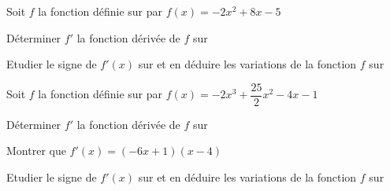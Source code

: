 \documentclass[12pt,a4paper]{book}
\begin{document}
Soit $f$ la fonction définie sur \R par $f(x)=-2x^2+8x-5$
\begin{enumMet}
	\item Déterminer $f'$ la fonction dérivée de $f$ sur \R
	\item Etudier le signe de $f'(x)$ sur \R et en déduire les variations de la fonction $f$ sur \R
\end{enumMet}

\exerciceDS{}

Soit $f$ la fonction définie sur \R par $f(x)=-2x^3+\dfrac{25}{2}x^2-4x-1$
\begin{enumMet}
	\item Déterminer $f'$ la fonction dérivée de $f$ sur \R
	\item Montrer que $f'(x)=(-6x+1)(x-4)$
	\item Etudier le signe de $f'(x)$ sur \R et en déduire les variations de la fonction $f$ sur \R
\end{enumMet}
\end{document}
